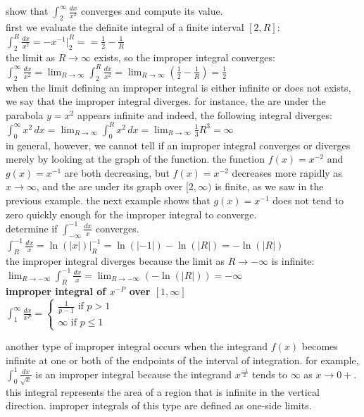 \documentclass{article}
\begin{document}
show that $\int_{2}^{\infty}\frac{dx}{x^2}$ converges and compute its value.\\
first we evaluate the definite integral of a finite interval $[2, R]$: $\int_{2}^{R}\frac{dx}{x^2} = -x^{-1}\Big|_2^R = = \frac{1}{2} - \frac{1}{R}$\\
the limit as $R \to \infty$ exists, so the improper integral converges:\\
$\int_{2}^{\infty}\frac{dx}{x^2} = \lim_{R \to \infty}\int_{2}^{R}\frac{dx}{x^2} = \lim_{R \to \infty}(\frac{1}{2} - \frac{1}{R}) = \frac{1}{2}$\\
when the limit defining an improper integral is either infinite or does not exists, we say that the improper integral diverges. for instance, the are under the parabola $y = x^2$ appears infinite and indeed, the following integral diverges:\\
$\int_{0}^{\infty}x^2\,dx = \lim_{R \to \infty}\int_{0}^{R}x^2\,dx = \lim_{R \to \infty}\frac{1}{3}R^3 = \infty$\\
in general, however, we cannot tell if an improper integral converges or diverges merely by looking at the graph of the function. the function $f(x) = x^{-2}$ and $g(x) = x^{-1}$ are both decreasing, but $f(x) = x^{-2}$ decreases more rapidly as $x \to \infty$, and the are under its graph over $[2, \infty)$ is finite, as we saw in the previous example. the next example shows that $g(x) = x^{-1}$ does not tend to zero quickly enough for the improper integral to converge.\\

determine if $\int_{-\infty}^{-1}\frac{dx}{x}$ converges.\\
$\int_{R}^{-1}\frac{dx}{x} = \ln(\lvert x\rvert)\Big|_{R}^{-1} = \ln(\lvert -1\rvert) - \ln(\lvert R\rvert) = -\ln(\lvert R\rvert)$\\ the improper integral diverges because the limit as $R \to -\infty$ is infinite:\\
$\lim_{R \to -\infty}\int_{R}^{-1}\frac{dx}{x} = \lim_{R \to -\infty}(-\ln(\lvert R\rvert)) = -\infty$\\

\textbf{improper integral of $x^{-P}$ over $[1, \infty]$}\\
$\int_{1}^{\infty}\frac{dx}{x^P} = 
\begin{cases}
	\frac{1}{p - 1} \text{ if } p>1\\
	\infty \text{ if } p\leq1
\end{cases}$

another type of improper integral occurs when the integrand $f(x)$ becomes infinite at one or both of the endpoints of the interval of integration. for example, $\int_{0}^{1}\frac{dx}{\sqrt{x}}$ is an improper integral because the integrand $x^{\frac{-1}{2}}$ tends to $\infty$ as $x \to 0+$. this integral represents the area of a region that is infinite in the vertical direction. improper integrals of this type are defined as one-side limits.\\
\end{document}
